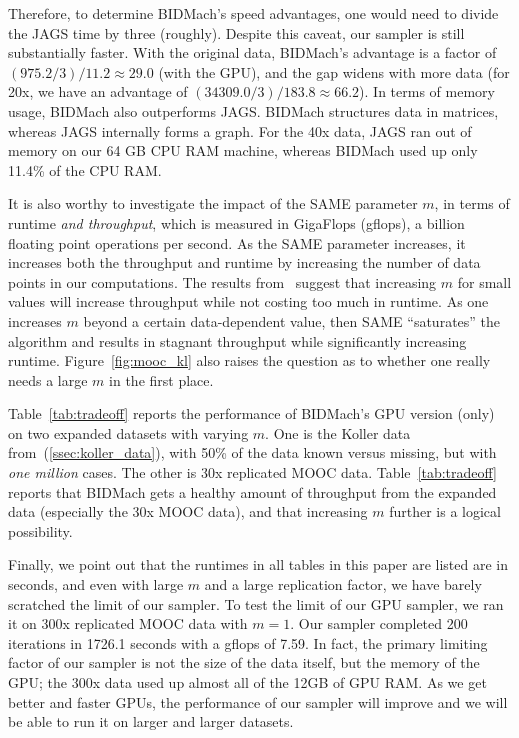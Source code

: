 \documentclass{article} %
\begin{document}
Therefore, to determine BIDMach's speed advantages, one would need to divide the JAGS time by
three (roughly). Despite this caveat, our sampler is still substantially faster. With the
original data, BIDMach's advantage is a factor of $(975.2/3)/11.2 \approx 29.0$ (with the GPU), and
the gap widens with more data (for 20x, we have an advantage of $(34309.0/3)/183.8\approx 66.2$).
In terms of memory usage, BIDMach also outperforms JAGS. BIDMach structures data in matrices,
whereas JAGS internally forms a graph.  For the 40x data, JAGS ran out of memory on our 64 GB CPU
RAM machine, whereas BIDMach used up only 11.4\% of the CPU RAM.

It is also worthy to investigate the impact of the SAME parameter $m$, in terms of runtime \emph{and
throughput}, which is measured in GigaFlops (gflops), a billion floating point operations per
second. As the SAME parameter increases, it increases both the throughput and runtime by increasing
the number of data points in our computations. The results from~\citep{SAME2015} suggest that
increasing $m$ for small values will increase throughput while not costing too much in runtime.  As
one increases $m$ beyond a certain data-dependent value, then SAME ``saturates'' the algorithm and
results in stagnant throughput while significantly increasing runtime.  Figure~\ref{fig:mooc_kl}
also raises the question as to whether one really needs a large $m$ in the first place.

Table~\ref{tab:tradeoff} reports the performance of BIDMach's GPU version (only) on two expanded
datasets with varying $m$. One is the Koller data from~(\ref{ssec:koller_data}), with 50\% of the
data known versus missing, but with \emph{one million} cases. The other is 30x replicated MOOC data.
Table~\ref{tab:tradeoff} reports that BIDMach gets a healthy amount of throughput from the expanded
data (especially the 30x MOOC data), and that increasing $m$ further is a logical possibility.

Finally, we point out that the runtimes in all tables in this paper are listed are in seconds, and
even with large $m$ and a large replication factor, we have barely scratched the limit of our
sampler. To test the limit of our GPU sampler, we ran it on 300x replicated MOOC data with $m=1$. Our sampler
completed 200 iterations in 1726.1 seconds with a gflops of 7.59.  In fact, the primary limiting
factor of our sampler is not the size of the data itself, but the memory of the GPU; the 300x data
used up almost all of the 12GB of GPU RAM. As we get better and faster GPUs, the performance of our
sampler will improve and we will be able to run it on larger and larger datasets.
\end{document}
